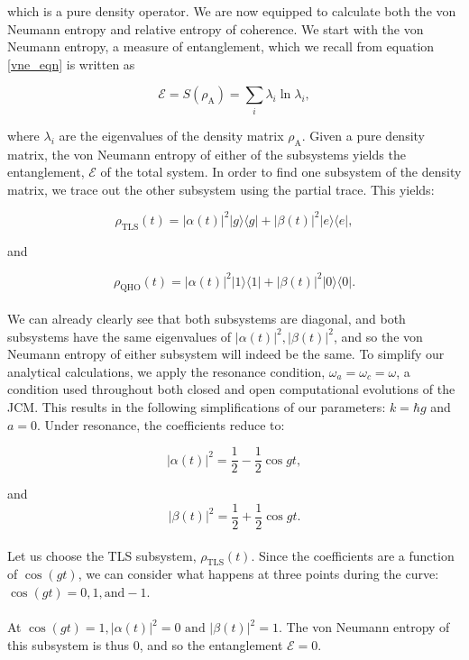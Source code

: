 \documentclass[11pt]{article}
\begin{document}
which is a pure density operator. We are now equipped to calculate both the von Neumann entropy and relative entropy of coherence. We start with the von Neumann entropy, a measure of entanglement, which we recall from equation \eqref{vne_eqn} is written as 

\begin{equation*}
   \mathcal{E} = S(\rho_{\scriptscriptstyle \text{A}}) = \sum_i \lambda_i\ln\lambda_i,
\end{equation*}

where $\lambda_i$ are the eigenvalues of the density matrix $\rho_{\scriptscriptstyle \text{A}}$. Given a pure density matrix, the von Neumann entropy of either of the subsystems yields the entanglement, $\mathcal{E}$ of the total system. In order to find one subsystem of the density matrix, we trace out the other subsystem using the partial trace. This yields:

\begin{equation*}
        \rho_{\scriptscriptstyle \text{TLS}}(t) = |\alpha(t)|^2|g\rangle\langle g| + |\beta(t)|^2 |e\rangle\langle e|,
\end{equation*}

and

\begin{equation} \label{eqn:subsys_JCM_closed}
        \rho_{\scriptscriptstyle \text{QHO}}(t) = |\alpha(t)|^2|1\rangle\langle 1| + |\beta(t)|^2 |0\rangle\langle 0|.
\end{equation}
\\
We can already clearly see that both subsystems are diagonal, and both subsystems have the same eigenvalues of $|\alpha(t)|^2,|\beta(t)|^2$, and so the von Neumann entropy of either subsystem will indeed be the same. To simplify our analytical calculations, we apply the resonance condition, $\omega_a = \omega_c = \omega$, a condition used throughout both closed and open computational evolutions of the JCM. This results in the following simplifications of our parameters: $k = \hbar g$ and $a = 0$. Under resonance, the coefficients reduce to:

\begin{equation*}
    |\alpha(t)|^2 = \frac{1}{2} - \frac{1}{2}\cos gt,
\end{equation*}

and 
\begin{equation} \label{eqn:JCM_complex_coeffs}
    |\beta(t)|^2 = \frac{1}{2} + \frac{1}{2}\cos gt.
\end{equation}
\\
Let us choose the TLS subsystem, $\rho_{\scriptscriptstyle \text{TLS}}(t)$. Since the coefficients are a function of $\cos(gt)$, we can consider what happens at three points during the curve: $\cos(gt) = 0,1, \text{and} -1$.\\
\\
At $\cos(gt) = 1, |\alpha(t)|^2 =0 \text{ and } |\beta(t)|^2 = 1$. The von Neumann entropy of this subsystem is thus $0$, and so the entanglement $\mathcal{E}=0$.
\end{document}
